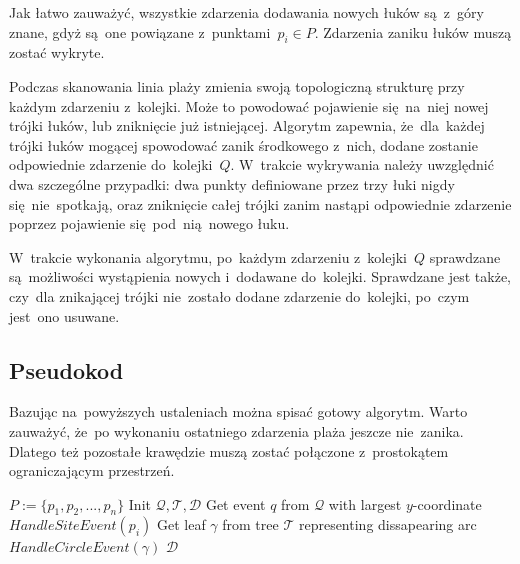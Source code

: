 \documentclass[skorowidz,autorrok,backref,xodstep,oswiadczenie]{wmimgr}
\begin{document}
Jak łatwo zauważyć, wszystkie zdarzenia dodawania nowych łuków są~z~góry znane, gdyż są~one powiązane z~punktami~$p_{i} \in P$. Zdarzenia zaniku łuków muszą zostać wykryte.

Podczas skanowania linia plaży zmienia swoją topologiczną strukturę przy każdym zdarzeniu z~kolejki. Może to powodować pojawienie się~na~niej nowej trójki łuków, lub zniknięcie już istniejącej. Algorytm zapewnia, że~dla~każdej trójki łuków mogącej spowodować zanik środkowego z~nich, dodane zostanie odpowiednie zdarzenie do~kolejki~$Q$. W~trakcie wykrywania należy uwzględnić dwa szczególne przypadki: dwa punkty definiowane przez trzy łuki nigdy się~nie~spotkają, oraz zniknięcie całej trójki zanim nastąpi odpowiednie zdarzenie poprzez pojawienie się~pod~nią~nowego łuku.

W~trakcie wykonania algorytmu, po~każdym zdarzeniu z~kolejki~$Q$ sprawdzane są~możliwości wystąpienia nowych i~dodawane do~kolejki. Sprawdzane jest także, czy~dla znikającej trójki nie~zostało dodane zdarzenie do~kolejki, po~czym jest~ono usuwane.

\subsection{Pseudokod}

Bazując na~powyższych ustaleniach można spisać gotowy algorytm. Warto zauważyć, że~po wykonaniu ostatniego zdarzenia plaża jeszcze nie~zanika. Dlatego też pozostałe krawędzie muszą zostać połączone z~prostokątem ograniczającym przestrzeń.

\begin{algorithm}
\caption{$VoronoiDiagram(P)$ \cite{geometria}}
\label{fortune}  %
\begin{algorithmic}
    \REQUIRE $P := \{p_{1}, p_{2}, ... , p_{n}\}$
    \STATE Init $\mathcal{Q, T, D}$
        \STATE Get event $q$ from $\mathcal{Q}$ with largest $y$-coordinate
            \STATE $HandleSiteEvent(p_{i})$
        \ELSE
            \STATE Get leaf $\gamma$ from tree $\mathcal{T}$ representing dissapearing arc
            \STATE $HandleCircleEvent(\gamma)$
        \ENDIF
    \ENDWHILE
    \RETURN $\mathcal{D}$
\end{algorithmic}
\end{algorithm}
\end{document}
